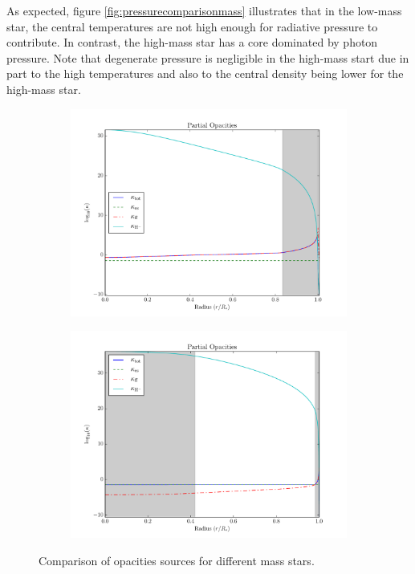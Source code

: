 \documentclass[11pt]{article}
\begin{document}
    As expected, figure \ref{fig:pressurecomparisonmass} illustrates that in the low-mass star, the central temperatures are not high enough for radiative pressure to contribute. In contrast, the high-mass star has a core dominated by photon pressure. Note that degenerate pressure is negligible in the high-mass start due in part to the high temperatures and also to the central density being lower for the high-mass star.
    \begin{center}
        \begin{figure}[H]
            \begin{subfigure}{.5\textwidth}
                \centering
                \includegraphics[width=1.1\textwidth]{figures/lowmass/partial_opacity.pdf}
            \end{subfigure}
            \begin{subfigure}{.5\textwidth}
                \centering
                \includegraphics[width=1.1\textwidth]{figures/highmass/partial_opacity.pdf}
            \end{subfigure}
            \caption{Comparison of opacities sources for different mass stars.}
            \label{fig:opacitycomparisonmass}
        \end{figure}
    \end{center}
\end{document}

